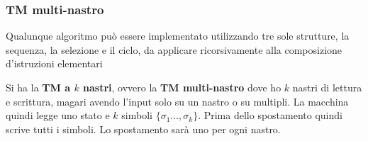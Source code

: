 \subsubsection{TM multi-nastro}
\begin{teorema}
  Qualunque algoritmo può essere implementato utilizzando tre sole strutture, la
  sequenza, la selezione e il ciclo, da applicare ricorsivamente alla
  composizione d'istruzioni elementari
\end{teorema}
\begin{definizione}
  Si ha la \textbf{TM a $k$ nastri}, ovvero la \textbf{TM
    multi-nastro} dove ho $k$ nastri di lettura e scrittura, magari avendo
  l'input solo su un nastro o su multipli. La macchina quindi legge uno stato e
  $k$ simboli $\{\sigma_1\ldots,\sigma_k\}$. Prima dello spostamento quindi
  scrive tutti i simboli. Lo spostamento sarà uno per ogni nastro.
\end{definizione}
